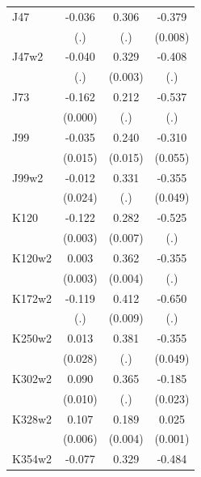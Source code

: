 \begin{table}[htbp]
\begin{tabular}{l*{3}{c}}
J47             &   -0.036         &    0.306         &   -0.379\sym{***}\\
                &      (.)         &      (.)         &  (0.008)         \\
J47w2           &   -0.040         &    0.329\sym{***}&   -0.408         \\
                &      (.)         &  (0.003)         &      (.)         \\
J73             &   -0.162\sym{***}&    0.212         &   -0.537         \\
                &  (0.000)         &      (.)         &      (.)         \\
J99             &   -0.035\sym{**} &    0.240\sym{***}&   -0.310\sym{***}\\
                &  (0.015)         &  (0.015)         &  (0.055)         \\
J99w2           &   -0.012         &    0.331         &   -0.355\sym{***}\\
                &  (0.024)         &      (.)         &  (0.049)         \\
K120            &   -0.122\sym{***}&    0.282\sym{***}&   -0.525         \\
                &  (0.003)         &  (0.007)         &      (.)         \\
K120w2          &    0.003         &    0.362\sym{***}&   -0.355         \\
                &  (0.003)         &  (0.004)         &      (.)         \\
K172w2          &   -0.119         &    0.412\sym{***}&   -0.650         \\
                &      (.)         &  (0.009)         &      (.)         \\
K250w2          &    0.013         &    0.381         &   -0.355\sym{***}\\
                &  (0.028)         &      (.)         &  (0.049)         \\
K302w2          &    0.090\sym{***}&    0.365         &   -0.185\sym{***}\\
                &  (0.010)         &      (.)         &  (0.023)         \\
K328w2          &    0.107\sym{***}&    0.189\sym{***}&    0.025\sym{***}\\
                &  (0.006)         &  (0.004)         &  (0.001)         \\
K354w2          &   -0.077         &    0.329\sym{***}&   -0.484         \\

\end{tabular}
\end{table}
